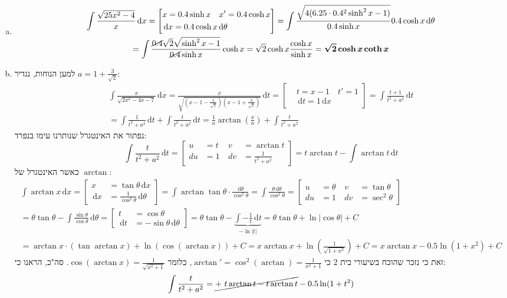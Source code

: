 \documentclass[]{article}
\newcommand\tant  {\tan \theta}
\newcommand\sinhx {\sinh x}
\newcommand\coshx {\cosh x}
\newcommand\dx    {\,\mathrm{d}x}
\newcommand\dt    {\,\mathrm{d}t}
\newcommand\dtt   {\,\mathrm{d}\theta}
\newcommand\pt[3]{\csb{\begin{aligned}
			&t = #1 \quad t' = #2 \\
			&\dt = #2 \dx #3
\end{aligned}}}
\newcommand\pts[2]{\csb{\begin{aligned}
t &= #1 \quad \\
\dt &= #2
\end{aligned}}}
\newcommand\px[3]{\csb{\begin{aligned}
&x = #1 \quad x' = #2 \\
&\dx = #2 #3
\end{aligned}}}
\newcommand\pxs[2]{\csb{\begin{aligned}
x &= #1\\
\dx &= #2
\end{aligned}}}
\newcommand\udv[4]{\csb{\begin{aligned}
			u &= #1  \ & v &= #3 \\
			du &= #2 \ & dv &= #4
\end{aligned}}}
\newcommand\ta    {\theta}
\newcommand\cl [1]    {\left ( #1 \right )}
\newcommand\csb[1]    {\left [ #1 \right ]}
\begin{document}
	\section{}
	\section{}
	\begin{enumerate}[a.]
		\item 
			\begin{multline*}
				\int \frac{\sqrt{25x^2 - 4}}{x}\dx = \px{0.4\sinhx}{0.4\coshx}{\dtt} = \int \frac{\sqrt{4(6.25 \cdot 0.4^2\sinh^2x - 1)}}{0.4\sinhx} 0.4\coshx\dtt \\
				= \int \frac{\cancel{0.4}\sqrt2\sqrt{\sinh^2x - 1}}{\cancel{0.4}\sinhx}\coshx = \sqrt{2}\coshx \frac{\coshx}{\sinhx} = \bm{\sqrt2 \coshx \coth x}
			\end{multline*}
		\item למען הנוחות, נגדיר $a = 1 + \frac{3}{\sqrt2}$: 
			\begin{multline*}
				\int \frac{x}{\sqrt{2x^2 - 4x - 7}} \dx = \frac{x}{\sqrt{\cl{x - 1 - \frac{3}{\sqrt2}}\cl{x - 1 + \frac{3}{\sqrt2}}}} \dt = \pt{x - 1}{1}{} = \int \frac{t + 1}{t^2 + a^2}\dt \\
				= \int \frac{1}{t^2 + a^2} \dt + \int \frac{t}{t^2 + a^2} \dt = \frac{1}{a}\arctan\cl{\frac{x}{a}} + \int \frac{t}{t^2 + a^2}
			\end{multline*}
			נפתור את האינטגרל שנותרנו עימו בנפרד: 
			\[ \int \frac{t}{t^2 + a^2} \dt = \udv{t}{1}{\arctan t}{\tfrac{1}{t^2 + a^2}} = t \arctan t - \int \arctan t \dt \]
			כאשר האינטגרל של $\arctan$: 
			\begin{multline*}
				\int \arctan x \dx = \pxs{\tant\dx}{\tfrac{1}{\cos^2\ta}\dtt} = \int \arctan \tant \cdot \frac{\dtt}{\cos^2 \ta} = \int \frac{\ta \dtt}{\cos^2\ta} = \udv{\ta}{1}{\tan\ta}{\sec^2\ta} \\
				= \ta \tan \ta - \int \frac{\sin\ta}{\cos\ta}\dtt = \pts{\cos \ta}{-\sin \ta \dtt} = \ta \tan \ta  - \underbrace{\int -\frac{1}{t} \dt}_{-\ln |t|} = \ta \tan \ta + \ln |\cos \ta| + C \\
				= \arctan x \cdot (\tan \arctan x) + \ln (\cos(\arctan x)) + C = x \arctan x + \ln \cl{\tfrac{1}{\sqrt{1 + x^2}}} + C = x\arctan x - 0.5 \ln (1 + x^2) + C
			\end{multline*}
			זאת כי נזכר שהוכח בשיעורי בית 2 כי $\arctan' = \cos^2(\arctan) = \frac{1}{x^2 + 1}$, כלומר $\cos(\arctan x) = \frac{1}{\sqrt{x^2 + 1}}$. סה"כ, הראנו כי: 
			\[ \int \frac{t}{t^2 + a^2} = \cancel{+\ t \arctan t - t \arctan t} - 0.5\ln(1 + t^2) \]

\end{enumerate}
\end{document}

